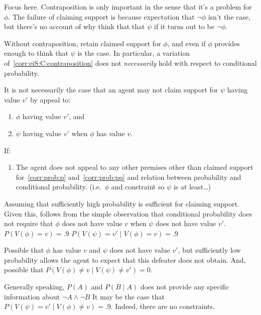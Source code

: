 \begin{note}
  Focus here.
  Contraposition is only important in the sense that it's a problem for \(\phi\).
  The failure of claiming support is because expectation that \(\lnot\phi\) isn't the case, but there's no account of why think that that \(\psi\) if it turns out to be \(\lnot\phi\).

  Without contraposition, retain claimed support for \(\phi\), and even if \mom{} \(\phi\) provides enough to think that \(\psi\) is the case.
  In particular, a variation of~\ref{corr:eiS:C:contraposition} does not \emph{necessarily} hold with respect to conditional probability.

  \begin{conjecture}\label{conj:eiS:C:probability}
    It is not necessarily the case that an agent may not claim support for \(\psi\) having value \(v'\) by appeal to:
    \begin{enumerate}[label=\arabic*., ref=(\arabic*)]
    \item\label{corr:prob:p} \(\phi\) having value \(v'\), and
    \item\label{corr:prob:pq} \(\psi\) having value \(v'\) when \(\phi\) has value \(v\).
    \end{enumerate}
    If:
    \begin{enumerate}[resume]
    \item The agent does not appeal to any other premises other than claimed support for~\ref{corr:prob:p} and~\ref{corr:prob:pq} and relation between probability and conditional probability.
      (i.e.\ \(\phi\) and constraint so \(\psi\) is at least\dots)
    \end{enumerate}
    \vspace{-\baselineskip}
  \end{conjecture}

  Assuming that sufficiently high probability is sufficient for claiming support.
  Given this, follows from the simple observation that conditional probability does not require that \(\phi\) does not have value \(v\) when \(\psi\) does not have value \(v'\).
  \(P(V(\phi) = v) = .9\)
  \(P(V(\psi) = v' \mid V(\phi) = v) = .9\)

  Possible that \(\phi\) has value \(v\) and \(\psi\) does not have value \(v'\), but sufficiently low probability allows the agent to expect that this defeater does not obtain.
  And, possible that \(P(V(\phi) \ne v \mid V(\psi) \ne v') = 0\).

  Generally speaking, \(P(A)\) and \(P(B \mid A)\) does not provide any specific information about \(\lnot A \land \lnot B\)
  It may be the case that \(P(V(\psi) = v' \mid V(\phi) \ne v) = .9\).
  Indeed, there are no constraints.


\end{note}
